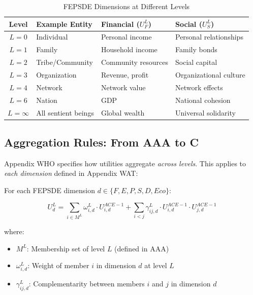 \begin{table}[htbp]
\centering
\caption{FEPSDE Dimensions at Different Levels}
\label{tab:app-c-level-dimension}
\renewcommand{\arraystretch}{1.3}
\small
\begin{tabular}{@{}clll@{}}
\toprule
\textbf{Level} & \textbf{Example Entity} & \textbf{Financial ($U^L_F$)} & \textbf{Social ($U^L_S$)} \\
\midrule
$L = 0$ & Individual & Personal income & Personal relationships \\
$L = 1$ & Family & Household income & Family bonds \\
$L = 2$ & Tribe/Community & Community resources & Social capital \\
$L = 3$ & Organization & Revenue, profit & Organizational culture \\
$L = 4$ & Network & Network value & Network effects \\
$L = 6$ & Nation & GDP & National cohesion \\
$L = \infty$ & All sentient beings & Global wealth & Universal solidarity \\
\bottomrule
\end{tabular}
\end{table}

\subsection{Aggregation Rules: From AAA to C}

Appendix WHO specifies how utilities aggregate \textit{across levels}. This applies 
to \textit{each dimension} defined in Appendix WAT:

\begin{tcolorbox}[colback=green!5!white, colframe=green!75!black, 
    title=Dimension-Specific Aggregation (from AAA Axiom SRL-3)]
For each FEPSDE dimension $d \in \{F, E, P, S, D, Eco\}$:

\begin{equation}
U^L_d = \sum_{i \in M^L} \omega^L_{i,d} \cdot U^{ACE-1}_{i,d} + \sum_{i < j} \gamma^L_{ij,d} \cdot U^{ACE-1}_{i,d} \cdot U^{ACE-1}_{j,d}
\end{equation}

where:
\begin{itemize}[nosep]
\item $M^L$: Membership set of level $L$ (defined in AAA)
\item $\omega^L_{i,d}$: Weight of member $i$ in dimension $d$ at level $L$
\item $\gamma^L_{ij,d}$: Complementarity between members $i$ and $j$ in dimension $d$
\end{itemize}
\end{tcolorbox}

